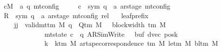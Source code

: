 \begin{isabellebody}
\ \ \ \ \ cM\ {\isacharcolon}{\kern0pt}{\isacharcolon}{\kern0pt}\ {\isachardoublequoteopen}{\isacharparenleft}{\kern0pt}{\isacharprime}{\kern0pt}a{\isacharcomma}{\kern0pt}\ {\isacharprime}{\kern0pt}q{\isacharparenright}{\kern0pt}\ mt{\isacharunderscore}{\kern0pt}config{\isachardoublequoteclose}\isanewline
\ \ \ \ \ c{}\ {\isacharcolon}{\kern0pt}{\isacharcolon}{\kern0pt}\ {\isachardoublequoteopen}{\isacharparenleft}{\kern0pt}sym{}{\isacharcomma}{\kern0pt}\ {\isacharprime}{\kern0pt}q\ {\isasymtimes}\ {\isacharprime}{\kern0pt}a\ ar{\isacharunderscore}{\kern0pt}stage{\isacharparenright}{\kern0pt}\ mt{\isacharunderscore}{\kern0pt}config{\isachardoublequoteclose}\isanewline
\ \ \ \ \ R{\isacharprime}{\kern0pt}\ {\isacharcolon}{\kern0pt}{\isacharcolon}{\kern0pt}\ {\isachardoublequoteopen}{\isacharparenleft}{\kern0pt}sym{}{\isacharcomma}{\kern0pt}\ {\isacharprime}{\kern0pt}q\ {\isasymtimes}\ {\isacharprime}{\kern0pt}a\ ar{\isacharunderscore}{\kern0pt}stage{\isacharparenright}{\kern0pt}\ mt{\isacharunderscore}{\kern0pt}config\ rel{\isachardoublequoteclose}\isanewline
\ \ \ leaf{\isacharunderscore}{\kern0pt}prefix{\isacharcolon}{\kern0pt}\isanewline
\ \ \ \ \ \ \ \ {\isachardoublequoteopen}{\isasymAnd}jj{\isachardot}{\kern0pt}\ {\isasymlbrakk}\ valid{\isacharunderscore}{\kern0pt}mttm\ M{\isacharsemicolon}{\kern0pt}\ q\ {\isasymin}\ Q{\isacharunderscore}{\kern0pt}tm\ M{\isacharsemicolon}{\kern0pt}\ {}\ {\isasymle}\ block{\isacharunderscore}{\kern0pt}width\ {\isacharparenleft}{\kern0pt}{\isasymGamma}{\isacharunderscore}{\kern0pt}tm\ M{\isacharparenright}{\kern0pt}{\isacharsemicolon}{\kern0pt}\isanewline
\ \ \ \ \ \ \ \ \ \ \ \ \ \ \ \ \ mt{\isacharunderscore}{\kern0pt}state\ c{}\ {\isacharequal}{\kern0pt}\ {\isacharparenleft}{\kern0pt}q{\isacharcomma}{\kern0pt}\ AR{\isacharunderscore}{\kern0pt}SimWrite{\isacharcomma}{\kern0pt}\ {}{\isacharcomma}{\kern0pt}\ {}{\isacharcomma}{\kern0pt}\ buf{\isacharcomma}{\kern0pt}\ dvec{\isacharcomma}{\kern0pt}\ posk{\isacharparenright}{\kern0pt}{\isacharsemicolon}{\kern0pt}\isanewline
\ \ \ \ \ \ \ \ \ \ \ \ \ \ \ \ \ {\isasymforall}k\ {\isacharless}{\kern0pt}\ k{\isacharunderscore}{\kern0pt}tm\ M{\isachardot}{\kern0pt}\ ar{\isacharunderscore}{\kern0pt}tape{\isacharunderscore}{\kern0pt}correspondence\ {\isacharparenleft}{\kern0pt}{\isasymGamma}{\isacharunderscore}{\kern0pt}tm\ M{\isacharparenright}{\kern0pt}\ {\isacharparenleft}{\kern0pt}le{\isacharunderscore}{\kern0pt}tm\ M{\isacharparenright}{\kern0pt}\ {\isacharparenleft}{\kern0pt}bl{\isacharunderscore}{\kern0pt}tm\ M{\isacharparenright}{\kern0pt}\isanewline

\end{isabellebody}
